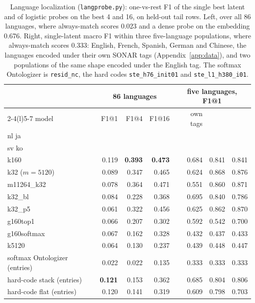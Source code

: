 \begin{table}[htbp]\centering\small\setlength{\tabcolsep}{4pt}
\begin{tabular}{@{}lrrrrrr@{}}
\toprule
& \multicolumn{3}{c}{86 languages} & \multicolumn{3}{c}{five languages, F1@1} \\
\cmidrule(lr){2-4}\cmidrule(l){5-7}
model & F1@1 & F1@4 & F1@16 & own tags & \stackhead[r]{it pt\\nl ja} & \stackhead[r]{ca ro\\sv ko} \\
\midrule
k160             & 0.119 & \textbf{0.393} & \textbf{0.473} & 0.684 & 0.841 & 0.841 \\
k32 ($m{=}5120$) & 0.089 & 0.347 & 0.465 & 0.624 & 0.868 & 0.876 \\
m11264\_k32      & 0.078 & 0.364 & 0.471 & 0.551 & 0.860 & 0.871 \\
k32\_bl          & 0.084 & 0.228 & 0.368 & 0.695 & 0.840 & 0.786 \\
k32\_p5          & 0.061 & 0.322 & 0.456 & 0.625 & 0.862 & 0.870 \\
g160top1         & 0.066 & 0.207 & 0.302 & 0.592 & 0.542 & 0.700 \\
g160softmax      & 0.067 & 0.162 & 0.328 & 0.432 & 0.437 & 0.433 \\
k5120            & 0.064 & 0.130 & 0.237 & 0.439 & 0.448 & 0.447 \\
softmax Ontologizer (entries) & 0.022 & 0.022 & 0.135 & 0.333 & 0.333 & 0.333 \\
hard-code stack (entries) & \textbf{0.121} & 0.153 & 0.362 & 0.685 & 0.804 & 0.806 \\
hard-code flat (entries) & 0.120 & 0.141 & 0.319 & 0.609 & 0.798 & 0.703 \\
\bottomrule
\end{tabular}
\caption{Language localization (\texttt{langprobe.py}): one-vs-rest F1
of the single best latent and of logistic probes on the best 4 and 16,
on held-out tail rows. Left, over all 86 languages, where always-match
scores 0.023 and a dense probe on the embedding 0.676. Right, single-latent
macro F1 within three five-language populations, where always-match
scores 0.333: English, French, Spanish, German and Chinese, the languages
encoded under their own SONAR tags (Appendix~\ref{app:data}), and two
populations of the same shape encoded under the English tag. The softmax
Ontologizer is \texttt{resid\_nc}, the hard codes
\texttt{ste\_h76\_init01} and \texttt{ste\_l1\_h380\_i01}.}
\label{tab:langlocal}
\end{table}

